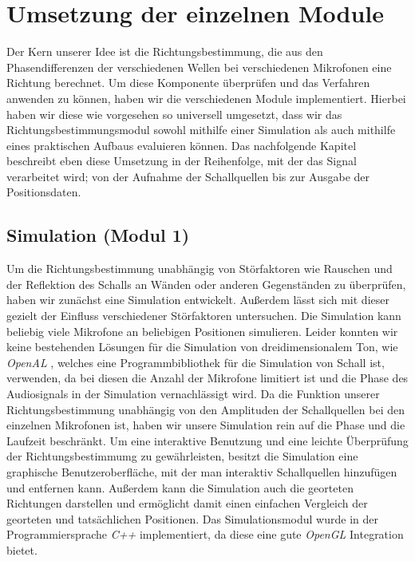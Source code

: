 \section{Umsetzung der einzelnen Module}
Der Kern unserer Idee ist die Richtungsbestimmung, die aus den Phasendifferenzen der verschiedenen Wellen bei verschiedenen Mikrofonen eine Richtung berechnet. Um diese Komponente überprüfen und das Verfahren anwenden zu können, haben wir die verschiedenen Module implementiert. Hierbei haben wir diese wie vorgesehen so universell umgesetzt, dass wir das Richtungsbestimmungsmodul sowohl mithilfe einer Simulation als auch mithilfe eines praktischen Aufbaus evaluieren können. Das nachfolgende Kapitel beschreibt eben diese Umsetzung in der Reihenfolge, mit der das Signal verarbeitet wird; von der Aufnahme der Schallquellen bis zur Ausgabe der Positionsdaten.

  \subsection{Simulation (Modul 1)}
  Um die Richtungsbestimmung unabhängig von Störfaktoren wie Rauschen und der Reflektion des Schalls an Wänden oder anderen Gegenständen zu überprüfen, haben wir zunächst eine Simulation entwickelt. Außerdem lässt sich mit dieser gezielt der Einfluss verschiedener Störfaktoren untersuchen. Die Simulation kann beliebig viele Mikrofone an beliebigen Positionen simulieren. Leider konnten wir keine bestehenden Lösungen für die Simulation von dreidimensionalem Ton, wie \textit{OpenAL} \cite{OpenAL}, welches eine Programmbibliothek für die Simulation von Schall ist, verwenden, da bei diesen die Anzahl der Mikrofone limitiert ist und die Phase des Audiosignals in der Simulation vernachlässigt wird. Da die Funktion unserer Richtungsbestimmung unabhängig von den Amplituden der Schallquellen bei den einzelnen Mikrofonen ist, haben wir unsere Simulation rein auf die Phase und die Laufzeit beschränkt. Um eine interaktive Benutzung und eine leichte Überprüfung der Richtungsbestimmumg zu gewährleisten, besitzt die Simulation eine graphische Benutzeroberfläche, mit der man interaktiv Schallquellen hinzufügen und entfernen kann. Außerdem kann die Simulation auch die georteten Richtungen darstellen und ermöglicht damit einen einfachen Vergleich der georteten und tatsächlichen Positionen. Das Simulationsmodul wurde in der Programmiersprache \textit{C++} implementiert, da diese eine gute \textit{OpenGL} Integration bietet.

